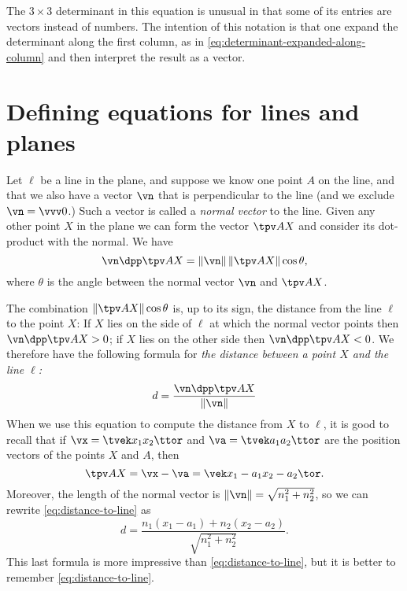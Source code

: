 The $3\times3$ determinant in this equation is unusual in that some of
its entries are vectors instead of numbers.  The intention of this
notation is that one expand the determinant along the first column, as
in \eqref{eq:determinant-expanded-along-column} and then interpret the
result as a vector.

\section{Defining equations for lines and planes} %
\label{sec:defin-equat-plan}
Let $\ell$ be a line in the plane, and suppose we know one point $A$ on the
line, and that we also have a vector $\vn$ that is perpendicular to the line
(and we exclude $\vn=\vvv0$.) Such a vector is called a \emph{normal vector} to
the line.  Given any other point $X$ in the plane we can form the vector $\tpv
AX$ and consider its dot-product with the normal.  We have
\[
  \vn \dpp \tpv AX = \|\vn\| \, \|\tpv AX\| \cos \theta,
\]
where $\theta$ is the angle between the normal vector $\vn$ and $\tpv AX$.

\begin{figure}[h]
  \hspace{-1em}
\end{figure}
The combination $\|\tpv AX\|\cos \theta$ is, up to its sign, the distance from
the line $\ell$ to the point $X$: If $X$ lies on the side of $\ell$ at which the
normal vector points then $\vn\dpp\tpv AX>0$; if $X$ lies on the other side then
$\vn\dpp\tpv AX<0$.  We therefore have the following formula for \textit{the
distance between a point $X$ and the line $\ell$:}
\begin{equation}
  d = \frac{\vn \dpp \tpv AX	}{\|\vn\|}
  \label{eq:distance-to-line}
\end{equation}
When we use this equation to compute the distance from $X$ to $\ell$, it is good
to recall that if $\vx=\tvek x_1\\x_2\ttor$ and $\va = \tvek a_1\\ a_2\ttor$ are
the position vectors of the points $X$ and $A$, then  
\[
  \tpv AX = \vx-\va = \vek x_1-a_1 \\ x_2-a_2\tor.
\]
Moreover, the length of the normal vector is $\|\vn\| = \sqrt{n_1^2+n_2^2}$, so
we can rewrite \eqref{eq:distance-to-line} as 
\[
  d = \frac{n_1(x_1-a_1) + n_2(x_2-a_2)}{\sqrt{n_1^2 + n_2^2}}.
\]
This last formula is more impressive than \eqref{eq:distance-to-line}, but it is
better to remember \eqref{eq:distance-to-line}.

